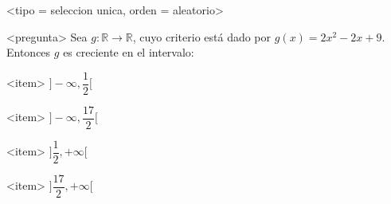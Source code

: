 <tipo = seleccion unica, orden = aleatorio>

<pregunta>
Sea $g:\mathbb R \to \mathbb R$, cuyo criterio est\'a dado por $g(x) = 2x^2 -2x +9$. Entonces $g$ es creciente en el intervalo:


<item>
$\bigg]{-}\infty, \dfrac{1}{2}\bigg[$

<item>
$\bigg]{-}\infty, \dfrac{17}{2}\bigg[$

<item>
$\bigg]\dfrac{1}{2}, +\infty\bigg[$

<item>
$\bigg]\dfrac{17}{2}, +\infty\bigg[$



